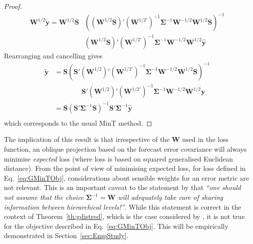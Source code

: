 \documentclass[12pt]{article}
\theoremstyle{definition}
\begin{document}
{\begin{proof}
	\begin{align*}
	\bm{W}^{1/2}\tilde{\bm{y}}=\bm{W}^{1/2}\bm{S}&\left((\bm{W}^{1/2}\bm{S})'(\bm{W}^{1/2'})^{-1}\bm{\Sigma}^{-1}\bm{W}^{-1/2}\bm{W}^{1/2}\bm{S}\right)^{-1}\\
	&(\bm{W}^{1/2}\bm{S})'(\bm{W}^{1/2'})^{-1}\bm{\Sigma}^{-1}\bm{W}^{-1/2}\bm{W}^{1/2}\hat{\bm{y}}
	\end{align*}
	Rearranging and cancelling gives
	\begin{align*}
    \tilde{\bm{y}}&=\bm{S}\left(\bm{S}'(\bm{W}^{1/2})'(\bm{W}^{1/2'})^{-1}\bm{\Sigma}^{-1}\bm{W}^{-1/2}\bm{W}^{1/2}\bm{S}\right)^{-1}\\
    &\qquad\qquad\bm{S}'(\bm{W}^{1/2})'(\bm{W}^{1/2'})^{-1}\bm{\Sigma}^{-1}\bm{W}^{-1/2}\bm{W}^{1/2}\hat{\bm{y}}\\
	&=\bm{S}\left(\bm{S}'\bm{\Sigma}^{-1}\bm{S}\right)^{-1}\bm{S}'\bm{\Sigma}^{-1}\hat{\bm{y}}\\
	\end{align*}
	which corresponds to the usual MinT method.
\end{proof}

The implication of this result is that irrespective of the ${\bm W}$ used in the loss function, an oblique projection based on the forecast error covariance will always minimise {\em expected} loss (where loss is based on squared generalised Euclidean distance).  From the point of view of minimising expected loss, for loss defined in Eq.~\eqref{eq:GMinTObj}, considerations about sensible weights for an error metric are not relevant.  This is an important caveat to the statement by \cite{VanErven2015a} that \textit{``one should not assume that the choice ${\bm\Sigma}^{-1}=\bm{W}$ will adequately take care of sharing information between hierarchical levels!''}.  While this statement is correct in the context of Theorem~\ref{th:gdistred}, which is the case considered by \cite{VanErven2015a}, it is not true for the objective described in Eq.~\eqref{eq:GMinTObj}. This will be empirically demonstrated in Section~\ref{sec:EmpStudy}.}
\end{document}
